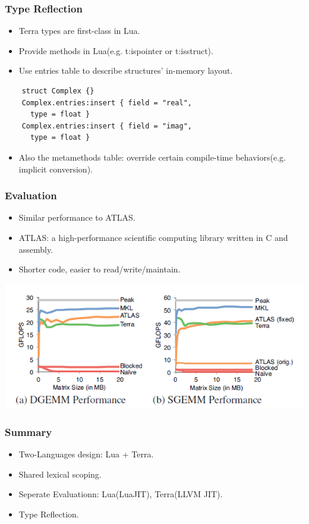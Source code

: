 \documentclass{beamer}
\begin{document}
\begin{frame}[fragile]
	\frametitle{Type Reflection}
  \begin{itemize}
  \item Terra types are first-class in Lua.\pause
  \item Provide methods in Lua(e.g. t:ispointer or t:isstruct).\pause
  \item Use entries table to describe structures' in-memory layout.
  \end{itemize}

  \begin{lstlisting}
    struct Complex {}
    Complex.entries:insert { field = "real",
      type = float }
    Complex.entries:insert { field = "imag",
      type = float }
\end{lstlisting}\pause

  \begin{itemize}
  \item Also the metamethods table: override certain compile-time behaviors(e.g. implicit conversion).
  \end{itemize}
\end{frame}

\begin{frame}
	\frametitle{Evaluation}
  \begin{itemize}
  \item Similar performance to ATLAS.\pause
  \item ATLAS: a high-performance scientific computing library written in C and assembly.\pause
  \item Shorter code, easier to read/write/maintain.\pause
  \end{itemize}

  \begin{center}
    \includegraphics[scale=0.5]{terra3.png}
  \end{center}
\end{frame}

\begin{frame}
	\frametitle{Summary}
  \begin{itemize}
  \item Two-Languages design: Lua + Terra.\pause
  \item Shared lexical scoping.\pause
  \item Seperate Evaluationn: Lua(LuaJIT), Terra(LLVM JIT).\pause
  \item Type Reflection.
  \end{itemize}
\end{frame}
\end{document}
